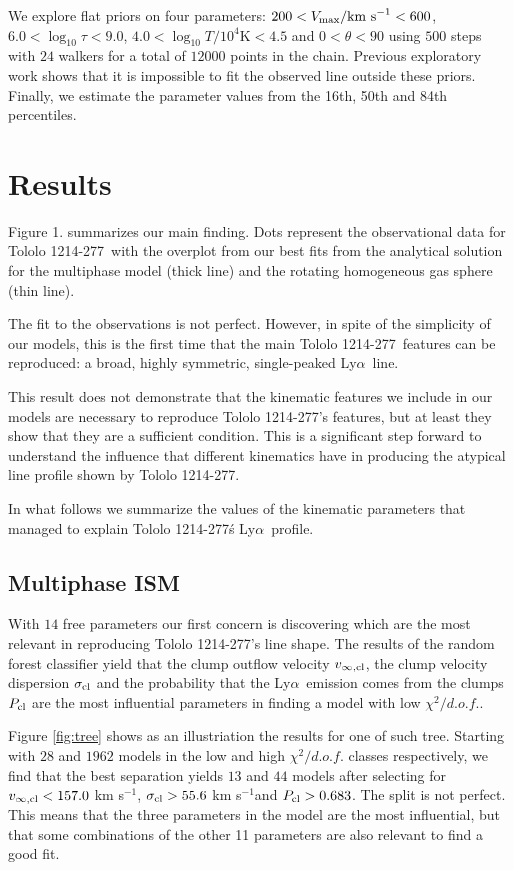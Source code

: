\documentclass[a4,useAMS,usenatbib,usegraphicx]{mn2e}
\newcommand{\tol}{Tololo 1214-277}
\newcommand{\lya}{Ly$\alpha$}
\newcommand{\kms}{km s$^{-1}$}
\begin{document}
We explore flat priors on four parameters: $200<V_{\rm
  max}/\mathrm{km\ s}^{-1} <600$,   $6.0<\log_{10}\tau<9.0$,
$4.0<\log_{10} T/10^4\mathrm{K}< 4.5$ and $0<\theta<90$ using $500$
steps with $24$ walkers for a total of $12000$ points in the chain.
Previous exploratory work shows that it is impossible to fit the
observed line outside these priors.
Finally, we estimate the parameter values from the 16th, 50th and 84th
percentiles. 


\section{Results}


Figure 1. summarizes our main finding.
Dots represent the observational data for \tol\ with the
overplot from our best fits from the analytical solution for the
multiphase model (thick line)  and the rotating homogeneous gas sphere
(thin line). 

The fit to the observations is not perfect. However, in spite of the
simplicity of our models, this is the first time that the main
\tol\ features can be reproduced: a broad, highly symmetric,
single-peaked \lya\ line. 

This result does not demonstrate that the kinematic features we
include in our models are necessary to reproduce \tol's features, but
at least they show that they are a sufficient condition.
This is a significant step forward to understand the influence that
different kinematics have in producing the atypical line profile shown
by \tol.

In what follows we summarize the values of the kinematic parameters
that managed to explain \tol\'s \lya\ profile.


\subsection{Multiphase ISM}

With $14$ free parameters our first concern is discovering which are
the most relevant in reproducing \tol's line shape.
The results of the random forest classifier yield that the clump outflow velocity
$v_{\infty,\rm{cl}}$, the clump velocity dispersion $\sigma_{\rm cl}$ and the probability
that the \lya\ emission comes from the clumps $P_{\rm cl}$ are the
most influential parameters in finding a model with low
$\chi^2/d.o.f.$.

Figure \ref{fig:tree} shows as an illustriation the results for one of such tree. 
Starting with $28$ and $1962$ models in the low and high
$\chi^2/d.o.f.$ classes respectively, we find that the best separation
yields $13$ and $44$ models after selecting for $v_{\infty,{\rm cl}}<157.0$ \kms,
$\sigma_{{\rm cl}}>55.6$ \kms and $P_{\rm cl}>0.683$.
The split is not perfect. This means that the three parameters in the
model are the most influential, but that some combinations of the
other 11 parameters are also relevant to find a good fit.
\end{document}
